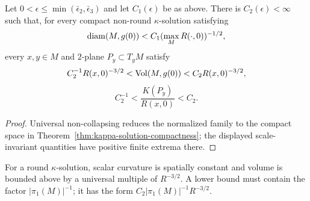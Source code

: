 \begin{proposition}\label{prop:compact-kappa-solution-volume-curvature-bounds}

Let $0<\epsilon\leq\min(\bar\epsilon_2,\bar\epsilon_3)$ and let
$C_1(\epsilon)$ be as above. There is $C_2(\epsilon)<\infty$ such
that, for every compact non-round $\kappa$-solution satisfying
\[
 \operatorname{diam}(M,g(0))<C_1(\max_MR(\cdot,0))^{-1/2},
\]
every $x,y\in M$ and $2$-plane $P_y\subset T_yM$ satisfy
\[
 C_2^{-1}R(x,0)^{-3/2}<\operatorname{Vol}(M,g(0))
 <C_2R(x,0)^{-3/2},
\]
\[
 C_2^{-1}<\frac{K(P_y)}{R(x,0)}<C_2.
\]
\end{proposition}
\begin{proof}
\sketch
{}
Universal non-collapsing reduces the normalized family to the compact
space in Theorem~\ref{thm:kappa-solution-compactness}; the displayed
scale-invariant quantities have positive finite extrema there.
\end{proof}

\begin{remark}\label{rem:round-kappa-solution-volume-remark}
For a round $\kappa$-solution, scalar curvature is spatially
constant and volume is bounded above by a universal multiple of
$R^{-3/2}$. A lower bound must contain the factor
$|\pi_1(M)|^{-1}$; it has the form
$C_2|\pi_1(M)|^{-1}R^{-3/2}$.
\end{remark}


